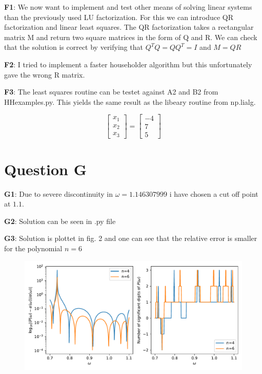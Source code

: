 \documentclass[a4paper,12pkt]{report}
\begin{document}
\textbf{F1}: We now want to implement and test other means of solving linear systems than the previously used LU factorization. For this we can introduce QR factorization and linear least squares. The QR factorization takes a rectangular matrix M and return two square matrices in the form of Q and R. We can check that the solution is correct by verifying that $Q^TQ=QQ^T=I$ and $M = QR$

\noindent
\textbf{F2}: I tried to implement a faster householder algorithm but this unfortunately gave the wrong R matrix.

\noindent
\textbf{F3}: The least squares routine can be testet against A2 and B2 from HHexamples.py. This yields the same result as the libeary routine from np.lialg.

\begin{equation}
    \begin{bmatrix}
        x_1 \\
        x_2 \\
        x_3 
    \end{bmatrix} = 
    \begin{bmatrix}
        -4 \\
        7 \\
        5 
    \end{bmatrix}
\end{equation}




\section*{Question G}

\textbf{G1}: Due to severe discontinuity in $\omega = 1.146307999$ i have chosen a cut off point at $1.1$.

\noindent
\textbf{G2}: Solution can be seen in .py file

\noindent
\textbf{G3}: Solution is plottet in fig. 2 and one can see that the relative error is smaller for the polynomial $n = 6$

\begin{figure}[h]
    \includegraphics[width = 12cm]{g.pdf}
    \centering
\end{figure}
\end{document}
